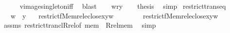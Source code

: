 \begin{isabellebody}
\ \ \ \ \isamarkupfalse%
\ vimage{\isacharunderscore}{\kern0pt}singleton{\isacharunderscore}{\kern0pt}iff\ \isamarkupfalse%
\ blast\isanewline
\ \ \isamarkupfalse%
\ {\isacartoucheopen}w{\isasymnotin}{\isacharquery}{\kern0pt}r{\isacharminus}{\kern0pt}{\isacharbackquote}{\kern0pt}{\isacharbackquote}{\kern0pt}{\isacharbraceleft}{\kern0pt}y{\isacharbraceright}{\kern0pt}{\isacartoucheclose}\isanewline
\ \ \isamarkupfalse%
\ {\isacharquery}{\kern0pt}thesis\ \isamarkupfalse%
\ simp\isanewline
{}\isamarkupfalse%
%
\endisatagproof
{\isafoldproof}%
%
\isadelimproof
\isanewline
%
\endisadelimproof
\isanewline
{}\isamarkupfalse%
\ restrict{\isacharunderscore}{\kern0pt}trans{\isacharunderscore}{\kern0pt}eq{\isacharcolon}{\kern0pt}\isanewline
\ \ \ {\isachardoublequoteopen}w\ {\isasymin}\ y{\isachardoublequoteclose}\isanewline
\ \ \ {\isachardoublequoteopen}restrict{\isacharparenleft}{\kern0pt}f{\isacharcomma}{\kern0pt}Memrel{\isacharparenleft}{\kern0pt}eclose{\isacharparenleft}{\kern0pt}{\isacharbraceleft}{\kern0pt}x{\isacharbraceright}{\kern0pt}{\isacharparenright}{\kern0pt}{\isacharparenright}{\kern0pt}{\isacharminus}{\kern0pt}{\isacharbackquote}{\kern0pt}{\isacharbackquote}{\kern0pt}{\isacharbraceleft}{\kern0pt}y{\isacharbraceright}{\kern0pt}{\isacharparenright}{\kern0pt}{\isacharbackquote}{\kern0pt}w\isanewline
\ \ \ \ \ \ \ {\isacharequal}{\kern0pt}\ restrict{\isacharparenleft}{\kern0pt}f{\isacharcomma}{\kern0pt}{\isacharparenleft}{\kern0pt}Memrel{\isacharparenleft}{\kern0pt}eclose{\isacharparenleft}{\kern0pt}{\isacharbraceleft}{\kern0pt}x{\isacharbraceright}{\kern0pt}{\isacharparenright}{\kern0pt}{\isacharparenright}{\kern0pt}{\isacharcircum}{\kern0pt}{\isacharplus}{\kern0pt}{\isacharparenright}{\kern0pt}{\isacharminus}{\kern0pt}{\isacharbackquote}{\kern0pt}{\isacharbackquote}{\kern0pt}{\isacharbraceleft}{\kern0pt}y{\isacharbraceright}{\kern0pt}{\isacharparenright}{\kern0pt}{\isacharbackquote}{\kern0pt}w{\isachardoublequoteclose}\isanewline
%
\isadelimproof
\ \ %
\endisadelimproof
%
\isatagproof
{}\isamarkupfalse%
\ assms\ restrict{\isacharunderscore}{\kern0pt}trancl{\isacharunderscore}{\kern0pt}Rrel{\isacharbrackleft}{\kern0pt}of\ mem\ {\isacharbrackright}{\kern0pt}\ Rrel{\isacharunderscore}{\kern0pt}mem\ \isamarkupfalse%
\ {\isacharparenleft}{\kern0pt}simp{\isacharparenright}{\kern0pt}%
\endisatagproof
{\isafoldproof}%
%
\isadelimproof
\isanewline
%
\endisadelimproof
\isanewline
{}\isamarkupfalse%

\end{isabellebody}
